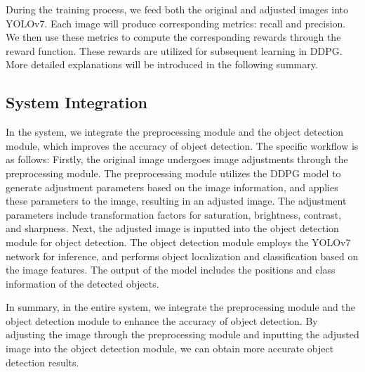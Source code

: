 \documentclass{PHlab-thesis}
\begin{document}
During the training process, we feed both the original and adjusted images into YOLOv7. Each image will produce corresponding metrics: recall and precision. We then use these metrics to compute the corresponding rewards through the reward function. These rewards are utilized for subsequent learning in DDPG. More detailed explanations will be introduced in the following summary.

\subsection{System Integration}
In the system, we integrate the preprocessing module and the object detection module, which improves the accuracy of object detection. The specific workflow is as follows: Firstly, the original image undergoes image adjustments through the preprocessing module. The preprocessing module utilizes the DDPG model to generate adjustment parameters based on the image information, and applies these parameters to the image, resulting in an adjusted image. The adjustment parameters include transformation factors for saturation, brightness, contrast, and sharpness. Next, the adjusted image is inputted into the object detection module for object detection. The object detection module employs the YOLOv7 network for inference, and performs object localization and classification based on the image features. The output of the model includes the positions and class information of the detected objects.

In summary, in the entire system, we integrate the preprocessing module and the object detection module to enhance the accuracy of object detection. By adjusting the image through the preprocessing module and inputting the adjusted image into the object detection module, we can obtain more accurate object detection results. 
\end{document}
